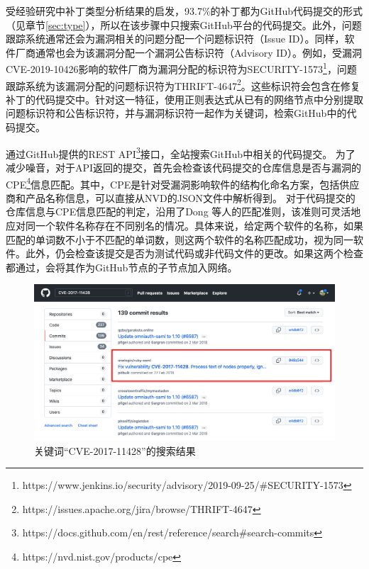 受经验研究中补丁类型分析结果的启发，93.7\%的补丁都为GitHub代码提交的形式（见章节\ref{sec:type}），所以在该步骤中\tool 只搜索GitHub平台的代码提交。此外，问题跟踪系统通常还会为漏洞相关的问题分配一个问题标识符（Issue ID）。同样，软件厂商通常也会为该漏洞分配一个漏洞公告标识符（Advisory ID）。例如，受漏洞CVE-2019-10426影响的软件厂商为漏洞分配的标识符为SECURITY-1573\footnote{https://www.jenkins.io/security/advisory/2019-09-25/\#SECURITY-1573}，问题跟踪系统为该漏洞分配的问题标识符为THRIFT-4647\footnote{https://issues.apache.org/jira/browse/THRIFT-4647}。这些标识符会包含在修复补丁的代码提交中。针对这一特征，\tool 使用正则表达式从已有的网络节点中分别提取问题标识符和公告标识符，并与漏洞标识符一起作为关键词，检索GitHub中的代码提交。

\tool 通过GitHub提供的REST API\footnote{https://docs.github.com/en/rest/reference/search\#search-commits}接口，全站搜索GitHub中相关的代码提交。%
为了减少噪音，对于API返回的提交，\tool 首先会检查该代码提交的仓库信息是否与漏洞的CPE\footnote{https://nvd.nist.gov/products/cpe}信息匹配。其中，CPE是针对受漏洞影响软件的结构化命名方案，包括供应商和产品名称信息，可以直接从NVD的JSON文件中解析得到。
对于代码提交的仓库信息与CPE信息匹配的判定，\tool 沿用了Dong 等人的匹配准则\cite{dong2019towards}，该准则可灵活地应对同一个软件名称存在不同别名的情况。具体来说，给定两个软件的名称，如果匹配的单词数不小于不匹配的单词数，则这两个软件的名称匹配成功，视为同一软件。此外，\tool 仍会检查该提交是否为测试代码或非代码文件的更改。如果这两个检查都通过，\tool 会将其作为GitHub节点的子节点加入网络。

\begin{figure}[!t]
    \centering
    \includegraphics[scale=0.39]{fig/commit-048a54}
    \caption{关键词“CVE-2017-11428”的搜索结果}\label{fig:048a54}
\end{figure}

